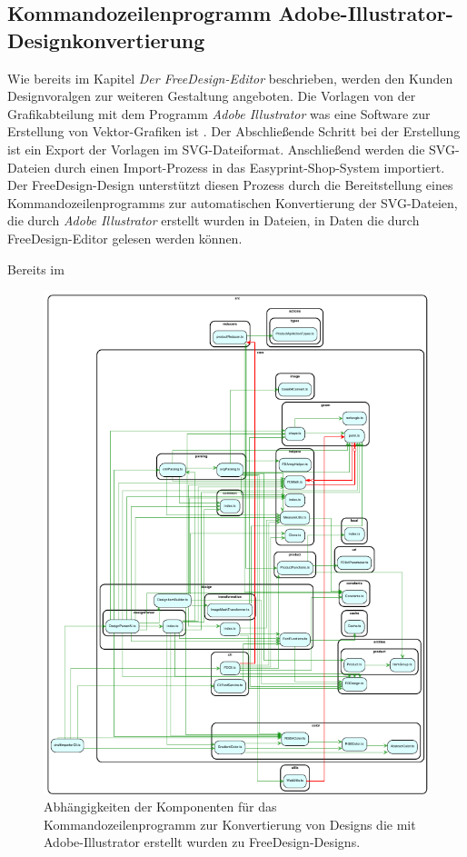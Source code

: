 \subsection{Kommandozeilenprogramm Adobe-Illustrator-Designkonvertierung}

Wie bereits im Kapitel 
\emph{Der FreeDesign-Editor} beschrieben, werden den Kunden Designvoralgen zur weiteren Gestaltung angeboten. 
Die Vorlagen von der Grafikabteilung mit dem Programm \emph{Adobe Illustrator} was eine Software zur Erstellung von Vektor-Grafiken ist 
. Der Abschließende Schritt bei der Erstellung ist ein Export der Vorlagen im SVG-Dateiformat. Anschließend werden die SVG-Dateien durch einen Import-Prozess in das Easyprint-Shop-System importiert. Der FreeDesign-Design unterstützt diesen Prozess durch die Bereitstellung eines Kommandozeilenprogramms zur automatischen Konvertierung der SVG-Dateien, die durch \emph{Adobe Illustrator} erstellt wurden in Dateien, in Daten die durch FreeDesign-Editor gelesen werden können.  

Bereits im 

\begin{figure}[H]
    \centering
    \includegraphics{diagrams/Ist-Architektur/draftImporter-analysis.pdf}
    \caption{Abhängigkeiten der Komponenten für das Kommandozeilenprogramm zur Konvertierung von Designs die mit Adobe-Illustrator erstellt wurden zu FreeDesign-Designs.}
    \label{fig:DesignImport}
\end{figure}

\begin{multicols}{2}    
    
\end{multicols}
